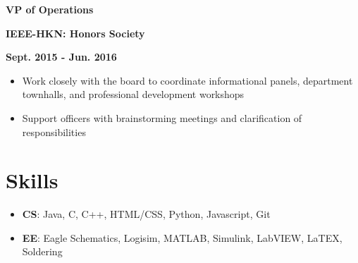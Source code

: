 \documentclass[12pt]{article}
\newcommand\textbox[1]{\parbox{.333\textwidth}{#1}}
\newcommand{\textlcr}[3]{\textbox{\textbf{#1}\hfill}\textbox{\hfil \textbf{#2}\hfil}\textbox{\hfill \textbf{#3}}}
\begin{document}
\textlcr{VP of Operations}{IEEE-HKN: Honors Society}{Sept. 2015 - Jun. 2016}
\begin{itemize}
\item Work closely with the board to coordinate informational panels, department townhalls, and professional development workshops
\item Support officers with brainstorming meetings and clarification of responsibilities
\end{itemize}

\section*{Skills}
\vspace*{-1em}\makebox[\linewidth]{\rule{\textwidth}{0.4pt}}
\begin{itemize}
\item \textbf{CS}: Java, C, C++, HTML/CSS, Python, Javascript, Git
\item \textbf{EE}: Eagle Schematics, Logisim, MATLAB, Simulink, LabVIEW, LaTEX, Soldering
\end{itemize}
\end{document}
